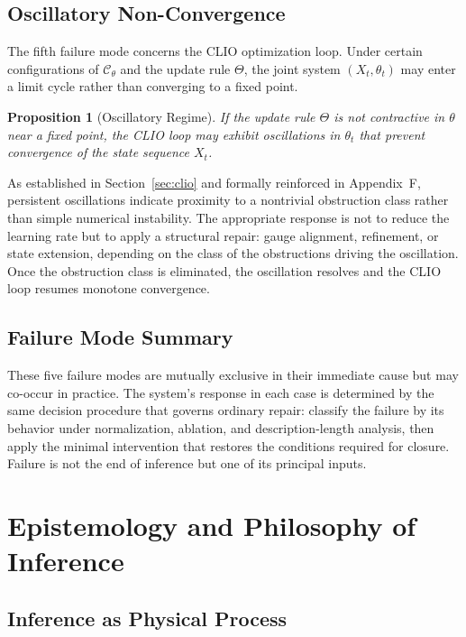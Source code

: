 \documentclass[12pt, oneside]{article}
\newtheorem{proposition}{Proposition}
\begin{document}
\subsection{Oscillatory Non-Convergence}

The fifth failure mode concerns the CLIO optimization loop. Under certain configurations of $\mathcal{C}_\theta$ and the update rule $\Theta$, the joint system $(X_t, \theta_t)$ may enter a limit cycle rather than converging to a fixed point.

\begin{proposition}[Oscillatory Regime]
If the update rule $\Theta$ is not contractive in $\theta$ near a fixed point, the CLIO loop may exhibit oscillations in $\theta_t$ that prevent convergence of the state sequence $X_t$.
\end{proposition}

As established in Section~\ref{sec:clio} and formally reinforced in Appendix~F, persistent oscillations indicate proximity to a nontrivial obstruction class rather than simple numerical instability. The appropriate response is not to reduce the learning rate but to apply a structural repair: gauge alignment, refinement, or state extension, depending on the class of the obstructions driving the oscillation. Once the obstruction class is eliminated, the oscillation resolves and the CLIO loop resumes monotone convergence.

\subsection{Failure Mode Summary}

These five failure modes are mutually exclusive in their immediate cause but may co-occur in practice. The system's response in each case is determined by the same decision procedure that governs ordinary repair: classify the failure by its behavior under normalization, ablation, and description-length analysis, then apply the minimal intervention that restores the conditions required for closure. Failure is not the end of inference but one of its principal inputs.

\section{Epistemology and Philosophy of Inference}

\subsection{Inference as Physical Process}
\end{document}
